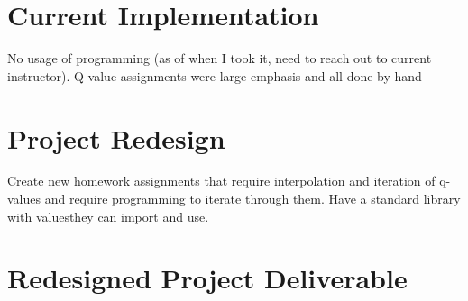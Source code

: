 \section{Current Implementation}
No usage of programming (as of when I took it, need to reach out 
to current instructor). Q-value assignments were large emphasis 
and all done by hand

\section{Project Redesign}
Create new homework assignments that require interpolation and 
iteration of q-values and require programming to iterate through 
them. Have a standard library with valuesthey can import and use.

\section{Redesigned Project Deliverable}